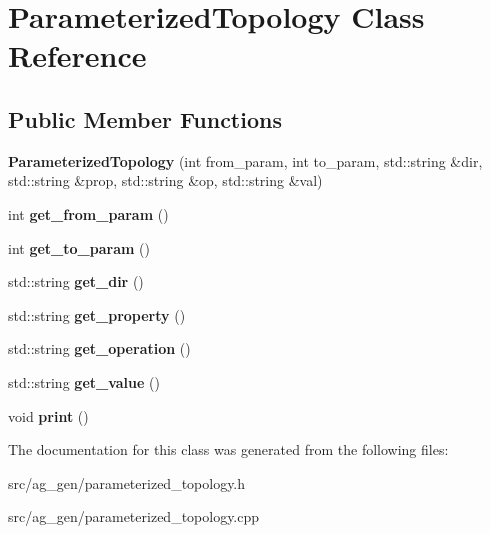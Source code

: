 \hypertarget{class_parameterized_topology}{}\section{Parameterized\+Topology Class Reference}
\label{class_parameterized_topology}
\subsection*{Public Member Functions}
\begin{DoxyCompactItemize}
\item 
\mbox{\label{class_parameterized_topology_ae27f389dcb62b6605af912e7f01db34e}} 
{\bfseries Parameterized\+Topology} (int from\+\_\+param, int to\+\_\+param, std\+::string \&dir, std\+::string \&prop, std\+::string \&op, std\+::string \&val)
\item 
\mbox{\label{class_parameterized_topology_a29c2e73fe247051bb482f7b62ec69e07}} 
int {\bfseries get\+\_\+from\+\_\+param} ()
\item 
\mbox{\label{class_parameterized_topology_a3731290eba71feec0e1dc328abbd3ccf}} 
int {\bfseries get\+\_\+to\+\_\+param} ()
\item 
\mbox{\label{class_parameterized_topology_a3053c3fa69b92c37eee58aefce96a35f}} 
std\+::string {\bfseries get\+\_\+dir} ()
\item 
\mbox{\label{class_parameterized_topology_a40d50bdba9284b71ad143967409314fb}} 
std\+::string {\bfseries get\+\_\+property} ()
\item 
\mbox{\label{class_parameterized_topology_ab3f13da35969abe7e676a248a55be891}} 
std\+::string {\bfseries get\+\_\+operation} ()
\item 
\mbox{\label{class_parameterized_topology_af2373d44e3d5b1f87498fe8fe5cabd74}} 
std\+::string {\bfseries get\+\_\+value} ()
\item 
\mbox{\label{class_parameterized_topology_aa438a3cdaa7b02e9a1984d68bf676990}} 
void {\bfseries print} ()
\end{DoxyCompactItemize}


The documentation for this class was generated from the following files\+:\begin{DoxyCompactItemize}
\item 
src/ag\+\_\+gen/parameterized\+\_\+topology.\+h\item 
src/ag\+\_\+gen/parameterized\+\_\+topology.\+cpp\end{DoxyCompactItemize}
